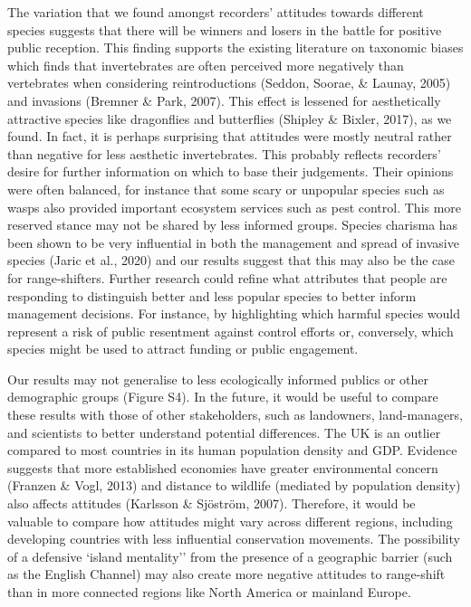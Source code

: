 \documentclass[
]{article}
\begin{document}
The variation that we found amongst recorders' attitudes towards
different species suggests that there will be winners and losers in the
battle for positive public reception. This finding supports the existing
literature on taxonomic biases which finds that invertebrates are often
perceived more negatively than vertebrates when considering
reintroductions (Seddon, Soorae, \& Launay, 2005) and invasions (Bremner
\& Park, 2007). This effect is lessened for aesthetically attractive
species like dragonflies and butterflies (Shipley \& Bixler, 2017), as
we found. In fact, it is perhaps surprising that attitudes were mostly
neutral rather than negative for less aesthetic invertebrates. This
probably reflects recorders' desire for further information on which to
base their judgements. Their opinions were often balanced, for instance
that some scary or unpopular species such as wasps also provided
important ecosystem services such as pest control. This more reserved
stance may not be shared by less informed groups. Species charisma has
been shown to be very influential in both the management and spread of
invasive species (Jaric et al., 2020) and our results suggest that this
may also be the case for range-shifters. Further research could refine
what attributes that people are responding to distinguish better and
less popular species to better inform management decisions. For
instance, by highlighting which harmful species would represent a risk
of public resentment against control efforts or, conversely, which
species might be used to attract funding or public engagement.

Our results may not generalise to less ecologically informed publics or
other demographic groups (Figure S4). In the future, it would be useful
to compare these results with those of other stakeholders, such as
landowners, land-managers, and scientists to better understand potential
differences. The UK is an outlier compared to most countries in its
human population density and GDP. Evidence suggests that more
established economies have greater environmental concern (Franzen \&
Vogl, 2013) and distance to wildlife (mediated by population density)
also affects attitudes (Karlsson \& Sjöström, 2007). Therefore, it would
be valuable to compare how attitudes might vary across different
regions, including developing countries with less influential
conservation movements. The possibility of a defensive `island
mentality'' from the presence of a geographic barrier (such as the
English Channel) may also create more negative attitudes to range-shift
than in more connected regions like North America or mainland Europe.
\end{document}
